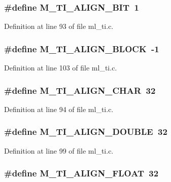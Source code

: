 \subsubsection{\setlength{\rightskip}{0pt plus 5cm}\#define M\_\-TI\_\-ALIGN\_\-BIT~1}\label{ml__ti_8c_001e2a727e21de44184b09d152b9adad}




Definition at line 93 of file ml\_\-ti.c.
\subsubsection{\setlength{\rightskip}{0pt plus 5cm}\#define M\_\-TI\_\-ALIGN\_\-BLOCK~-1}\label{ml__ti_8c_ba45bb7f1c3d2687b756807413909855}




Definition at line 103 of file ml\_\-ti.c.
\subsubsection{\setlength{\rightskip}{0pt plus 5cm}\#define M\_\-TI\_\-ALIGN\_\-CHAR~32}\label{ml__ti_8c_94da9a03f750eeb505dae6cd5c57aac3}




Definition at line 94 of file ml\_\-ti.c.
\subsubsection{\setlength{\rightskip}{0pt plus 5cm}\#define M\_\-TI\_\-ALIGN\_\-DOUBLE~32}\label{ml__ti_8c_4bcaa2955b17fb30aef2c953074fb0d0}




Definition at line 99 of file ml\_\-ti.c.
\subsubsection{\setlength{\rightskip}{0pt plus 5cm}\#define M\_\-TI\_\-ALIGN\_\-FLOAT~32}\label{ml__ti_8c_f21ab0f10d67453a4e8c09b66358f1a9}




